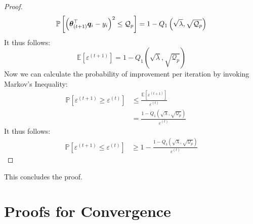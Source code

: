 \documentclass{article} %
\begin{document}
\begin{appendices}
\begin{proof}
		\begin{equation*}
			\mathbb{P}\left[\left({\bm{\theta}}^\top_{(t+1)}{\bm{q}}_i -y_i\right)^2 \leq \mathcal{Q}_p\right] = 1 - Q_{1}\left(\sqrt{\lambda},\sqrt{\mathcal{Q}_p}\right)
		\end{equation*}
		It thus follows:
		\begin{equation*}
			\mathbb{E}\left[\varepsilon^{(t+1)}\right] = 1 - Q_{1}\left(\sqrt{\lambda},\sqrt{\mathcal{Q}_p}\right)
		\end{equation*}
		Now we can calculate the probability of improvement per iteration by invoking Markov's Inequality:
		\begin{align*}
			\mathbb{P}\left[\varepsilon^{(t+1)} \geq \varepsilon^{(t)}\right] &\leq \frac{\mathbb{E}\left[\varepsilon^{(t+1)}\right]}{\varepsilon^{(t)}} &&\\
			&= \frac{1 - Q_{1}\left(\sqrt{\lambda},\sqrt{\mathcal{Q}_p}\right)}{\varepsilon^{(t)}}
		\end{align*}
		It thus follows:
		\begin{align*}
			\mathbb{P}\left[\varepsilon^{(t+1)} \leq \varepsilon^{(t)}\right] &\geq 1 - \frac{1 - Q_{1}\left(\sqrt{\lambda},\sqrt{\mathcal{Q}_p}\right)}{\varepsilon^{(t)}}
		\end{align*} 
	\end{proof}
	This concludes the proof.
	\newpage
	
	\section{Proofs for Convergence}
	\label{app:convergence-proofs}

\end{appendices}
\end{document}

